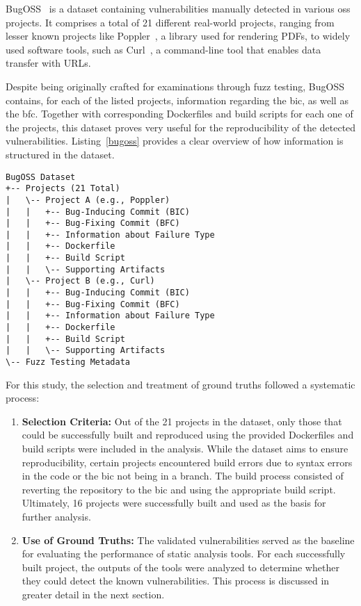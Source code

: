 BugOSS~\cite{BugOSS} is a dataset containing vulnerabilities manually detected in various \acl{oss} projects.
It comprises a total of 21 different real-world projects, ranging from lesser known projects like Poppler~\cite{poppler}, a library used for rendering PDFs, to widely used software tools, such as Curl~\cite{curl}, a command-line tool that enables data transfer with URLs.

Despite being originally crafted for examinations through fuzz testing, BugOSS contains, for each of the listed projects, information regarding the \ac{bic}, as well as the \ac{bfc}. 
Together with corresponding Dockerfiles and build scripts for each one of the projects, this dataset proves very useful for the reproducibility of the detected vulnerabilities.
Listing~\ref{bugoss} provides a clear overview of how information is structured in the dataset.

\begin{lstlisting}[caption={Hierarchy of the BugOSS dataset}, label={bugoss}]
BugOSS Dataset
+-- Projects (21 Total)
|   \-- Project A (e.g., Poppler)
|   |   +-- Bug-Inducing Commit (BIC)
|   |   +-- Bug-Fixing Commit (BFC)
|   |   +-- Information about Failure Type
|   |   +-- Dockerfile
|   |   +-- Build Script
|   |   \-- Supporting Artifacts
|   \-- Project B (e.g., Curl)
|   |   +-- Bug-Inducing Commit (BIC)
|   |   +-- Bug-Fixing Commit (BFC)
|   |   +-- Information about Failure Type
|   |   +-- Dockerfile
|   |   +-- Build Script
|   |   \-- Supporting Artifacts
\-- Fuzz Testing Metadata
\end{lstlisting}

For this study, the selection and treatment of ground truths followed a systematic process:
\begin{enumerate}
    \item \textbf{Selection Criteria:} Out of the 21 projects in the dataset, only those that could be successfully built and reproduced using the provided Dockerfiles and build scripts were included in the analysis. While the dataset aims to ensure reproducibility, certain projects encountered build errors due to syntax errors in the code or the \ac{bic} not being in a branch. The build process consisted of reverting the repository to the \ac{bic} and using the appropriate build script. Ultimately, 16 projects were successfully built and used as the basis for further analysis.

    \item \textbf{Use of Ground Truths:} The validated vulnerabilities served as the baseline for evaluating the performance of static analysis tools. For each successfully built project, the outputs of the tools were analyzed to determine whether they could detect the known vulnerabilities. This process is discussed in greater detail in the next section.
\end{enumerate}